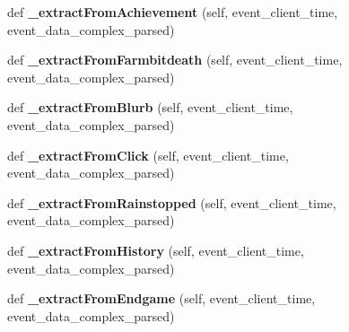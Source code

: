 \begin{DoxyCompactItemize}
def {\bfseries \+\_\+extract\+From\+Achievement} (self, event\+\_\+client\+\_\+time, event\+\_\+data\+\_\+complex\+\_\+parsed)
\item 
\mbox{\label{classfeature__extractors_1_1_lakeland_extractor_1_1_lakeland_extractor_a4b31497ce463a73f676ab3803caaa9aa}} 
def {\bfseries \+\_\+extract\+From\+Farmbitdeath} (self, event\+\_\+client\+\_\+time, event\+\_\+data\+\_\+complex\+\_\+parsed)
\item 
\mbox{\label{classfeature__extractors_1_1_lakeland_extractor_1_1_lakeland_extractor_a4ee784abbc81a1f82b2333b317315c7b}} 
def {\bfseries \+\_\+extract\+From\+Blurb} (self, event\+\_\+client\+\_\+time, event\+\_\+data\+\_\+complex\+\_\+parsed)
\item 
\mbox{\label{classfeature__extractors_1_1_lakeland_extractor_1_1_lakeland_extractor_af5a8aaf54baf672582e392bc56a55984}} 
def {\bfseries \+\_\+extract\+From\+Click} (self, event\+\_\+client\+\_\+time, event\+\_\+data\+\_\+complex\+\_\+parsed)
\item 
\mbox{\label{classfeature__extractors_1_1_lakeland_extractor_1_1_lakeland_extractor_aa29d461436adf18f0fb6ce895ca7696e}} 
def {\bfseries \+\_\+extract\+From\+Rainstopped} (self, event\+\_\+client\+\_\+time, event\+\_\+data\+\_\+complex\+\_\+parsed)
\item 
\mbox{\label{classfeature__extractors_1_1_lakeland_extractor_1_1_lakeland_extractor_aa12dfb5c88f09a7cd4651fb47ccab65a}} 
def {\bfseries \+\_\+extract\+From\+History} (self, event\+\_\+client\+\_\+time, event\+\_\+data\+\_\+complex\+\_\+parsed)
\item 
\mbox{\label{classfeature__extractors_1_1_lakeland_extractor_1_1_lakeland_extractor_a4c27bc7aaa00fbf15f5b6d62ff177e28}} 
def {\bfseries \+\_\+extract\+From\+Endgame} (self, event\+\_\+client\+\_\+time, event\+\_\+data\+\_\+complex\+\_\+parsed)
\item 

\end{DoxyCompactItemize}
